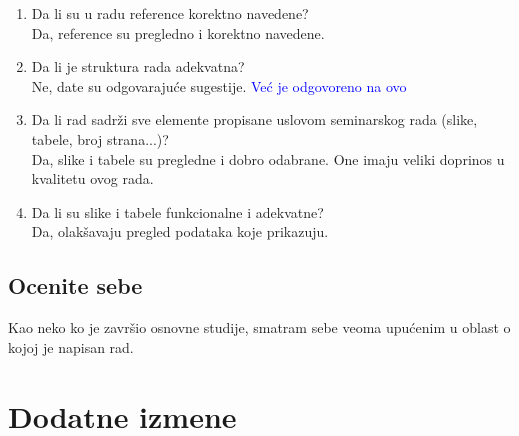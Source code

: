 \documentclass[a4paper]{report}
\newcommand{\odgovor}[1]{\textcolor{blue}{#1}}
\begin{document}
\begin{enumerate}
 \item Da li su u radu reference korektno navedene?\\
 Da, reference su pregledno i korektno navedene.
 
 
 \item Da li je struktura rada adekvatna?\\
 Ne, date su odgovarajuće sugestije.
 \odgovor{Već je odgovoreno na ovo}
 
 \item Da li rad sadrži sve elemente propisane uslovom seminarskog rada (slike, tabele, broj strana...)?\\
 Da, slike i tabele su pregledne i dobro odabrane. One imaju veliki doprinos u kvalitetu ovog rada.
 
 
 \item Da li su slike i tabele funkcionalne i adekvatne?\\
 Da, olakšavaju pregled podataka koje prikazuju.
 
 \end{enumerate}
 
 \section{Ocenite sebe}
 Kao neko ko je završio osnovne studije, smatram sebe veoma upućenim u oblast o kojoj je napisan rad.
 
 
 \chapter{Dodatne izmene}
 
 
\end{document}
